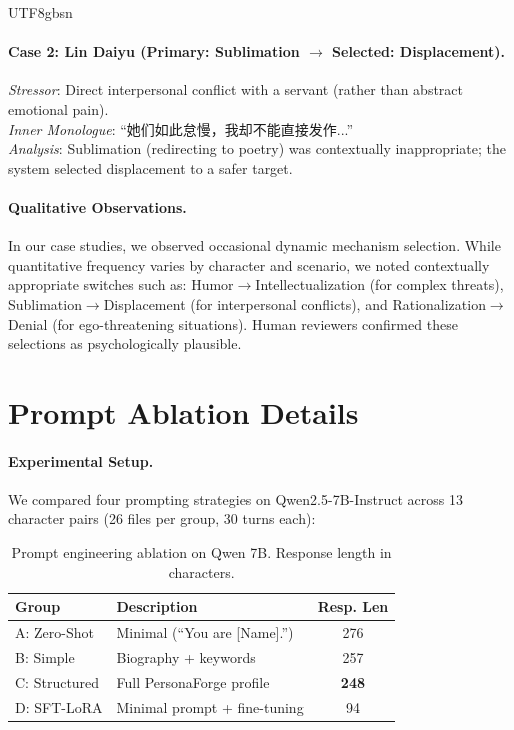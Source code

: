 \documentclass[11pt]{article}
\begin{document}
\begin{CJK*}{UTF8}{gbsn}
\paragraph{Case 2: Lin Daiyu (Primary: Sublimation $\rightarrow$ Selected: Displacement).}
\textit{Stressor}: Direct interpersonal conflict with a servant (rather than abstract emotional pain). \\
\textit{Inner Monologue}: ``她们如此怠慢，我却不能直接发作...'' \\
\textit{Analysis}: Sublimation (redirecting to poetry) was contextually inappropriate; the system selected displacement to a safer target.

\paragraph{Qualitative Observations.} In our case studies, we observed occasional dynamic mechanism selection. While quantitative frequency varies by character and scenario, we noted contextually appropriate switches such as: Humor$\rightarrow$Intellectualization (for complex threats), Sublimation$\rightarrow$Displacement (for interpersonal conflicts), and Rationalization$\rightarrow$Denial (for ego-threatening situations). Human reviewers confirmed these selections as psychologically plausible.

\section{Prompt Ablation Details}
\label{sec:prompt_ablation_details}

\paragraph{Experimental Setup.} We compared four prompting strategies on Qwen2.5-7B-Instruct across 13 character pairs (26 files per group, 30 turns each):

\begin{table}[h]
\centering
\small
\begin{tabular}{lp{4.2cm}c}
\toprule
\textbf{Group} & \textbf{Description} & \textbf{Resp. Len} \\
\midrule
A: Zero-Shot & Minimal (``You are [Name].'') & 276 \\
B: Simple & Biography + keywords & 257 \\
C: Structured & Full PersonaForge profile & \textbf{248} \\
D: SFT-LoRA & Minimal prompt + fine-tuning & 94 \\
\bottomrule
\end{tabular}
\caption{Prompt engineering ablation on Qwen 7B. Response length in characters.}
\label{tab:prompt_ablation_full}
\end{table}


\end{CJK*}
\end{document}
